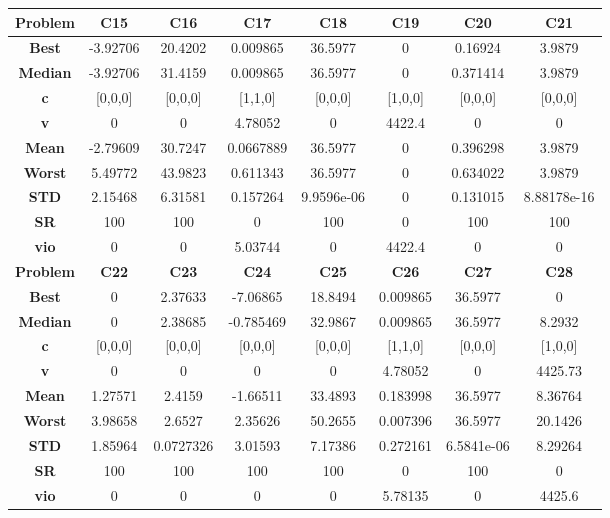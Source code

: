 \documentclass{IEEEtran}
\begin{document}
\begin{center}
\begin{tabular}{|c|c|c|c|c|c|c|c|}
    \hline 
    \hline 
    \textbf{Problem} & \textbf{C15} & \textbf{C16} & \textbf{C17} & \textbf{C18} & \textbf{C19} & \textbf{C20} & \textbf{C21} \\ 
    \hline\hline 
    \textbf{Best} & -3.92706 & 20.4202 & 0.009865 & 36.5977 & 0 & 0.16924 & 3.9879\\ 
    \textbf{Median} & -3.92706 & 31.4159 & 0.009865 & 36.5977 & 0 & 0.371414 & 3.9879\\ 
    \textbf{c} & [0,0,0] & [0,0,0] & [1,1,0] & [0,0,0] & [1,0,0] & [0,0,0] & [0,0,0]\\ 
    \textbf{v} & 0 & 0 & 4.78052 & 0 & 4422.4 & 0 & 0\\ 
    \textbf{Mean} & -2.79609 & 30.7247 & 0.0667889 & 36.5977 & 0 & 0.396298 & 3.9879\\ 
    \textbf{Worst} & 5.49772 & 43.9823 & 0.611343 & 36.5977 & 0 & 0.634022 & 3.9879\\ 
    \textbf{STD} & 2.15468 & 6.31581 & 0.157264 & 9.9596e-06 & 0 & 0.131015 & 8.88178e-16\\ 
    \textbf{SR} & 100 & 100 & 0 & 100 & 0 & 100 & 100\\ 
    \textbf{vio} & 0 & 0 & 5.03744 & 0 & 4422.4 & 0 & 0\\ 
    \hline 
    \hline 
    \textbf{Problem} & \textbf{C22} & \textbf{C23} & \textbf{C24} & \textbf{C25} & \textbf{C26} & \textbf{C27} & \textbf{C28} \\ 
    \hline\hline 
    \textbf{Best} & 0 & 2.37633 & -7.06865 & 18.8494 & 0.009865 & 36.5977 & 0\\ 
    \textbf{Median} & 0 & 2.38685 & -0.785469 & 32.9867 & 0.009865 & 36.5977 & 8.2932\\ 
    \textbf{c} & [0,0,0] & [0,0,0] & [0,0,0] & [0,0,0] & [1,1,0] & [0,0,0] & [1,0,0]\\ 
    \textbf{v} & 0 & 0 & 0 & 0 & 4.78052 & 0 & 4425.73\\ 
    \textbf{Mean} & 1.27571 & 2.4159 & -1.66511 & 33.4893 & 0.183998 & 36.5977 & 8.36764\\ 
    \textbf{Worst} & 3.98658 & 2.6527 & 2.35626 & 50.2655 & 0.007396 & 36.5977 & 20.1426\\ 
    \textbf{STD} & 1.85964 & 0.0727326 & 3.01593 & 7.17386 & 0.272161 & 6.5841e-06 & 8.29264\\ 
    \textbf{SR} & 100 & 100 & 100 & 100 & 0 & 100 & 0\\ 
    \textbf{vio} & 0 & 0 & 0 & 0 & 5.78135 & 0 & 4425.6\\ 
    \hline 
  \end{tabular}
\end{center}
\newpage
\end{document}
